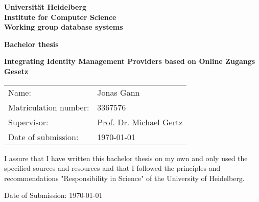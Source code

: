 \documentclass[
     12pt,         %
     a4paper,      %
     BCOR=10mm,version=first,     %
     DIV=14,version=first,        %
     ]{scrreprt}
\begin{document}
\begin{titlepage}
     \vspace*{1cm}
     \begin{center}
          \vspace*{3cm}
          \textbf
          {
               \Large Universität Heidelberg\\
               \smallskip
               \Large Institute for Computer Science\\
               \smallskip
               \Large Working group database systems\\
               \smallskip
          }

          \vspace{3cm}

          \textbf{\large Bachelor thesis}

          \vspace{0.5\baselineskip}
          {
               \huge
               \textbf{Integrating Identity Management Providers based on Online Zugangs Gesetz}
          }

     \end{center}

     \vfill
     {
          \large
          \begin{tabular}[l]{ll}
               Name:                 & Jonas Gann              \\
               Matriculation number: & 3367576                 \\
               Supervisor:           & Prof. Dr. Michael Gertz \\
               Date of submission:   & \today
          \end{tabular}
     }

\end{titlepage}

\onehalfspacing

\thispagestyle{empty}

\vspace*{100pt}
\noindent
I assure that I have written this bachelor thesis on my own and only used the specified sources and resources and that I followed the principles and recommendations "Responsibility in Science" of the University of Heidelberg.

\vspace*{50pt}
\noindent

\underline{\phantom{mmmmmmmmmmmmmmmmmmmm}}

\medskip
\noindent
Date of Submission: \today
\newpage
\end{document}
